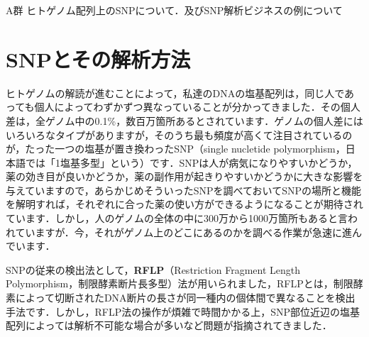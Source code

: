 \documentclass[a4paper,11pt]{jsarticle}
\numberwithin{theorem}{section}  %
\numberwithin{equation}{section} %
\begin{document}
{}
\renewcommand{\thepart}{\arabic{part}}


\begin{itembox}[l]{A群}
ヒトゲノム配列上のSNPについて．及びSNP解析ビジネスの例について
\end{itembox}

\section{SNPとその解析方法}

ヒトゲノムの解読が進むことによって，私達のDNAの塩基配列は，同じ人であっても個人によってわずかずつ異なっていることが分かってきました．その個人差は，全ゲノム中の0.1\%，数百万箇所あるとされています．ゲノムの個人差にはいろいろなタイプがありますが，そのうち最も頻度が高くて注目されているのが，たった一つの塩基が置き換わったSNP（single nucletide polymorphism，日本語では「1塩基多型」という）です\cite{genome}．SNPは人が病気になりやすいかどうか，薬の効き目が良いかどうか，薬の副作用が起きりやすいかどうかに大きな影響を与えていますので，あらかじめそういったSNPを調べておいてSNPの場所と機能を解明すれば，それぞれに合った薬の使い方ができるようになることが期待されています．しかし，人のゲノムの全体の中に300万から1000万箇所もあると言われていますが．今，それがゲノム上のどこにあるのかを調べる作業が急速に進んでいます．

SNPの従来の検出法として，{\bf RFLP}（Restriction Fragment Length Polymorphism，制限酵素断片長多型）法が用いられました，RFLPとは，制限酵素によって切断されたDNA断片の長さが同一種内の個体間で異なることを検出手法です．しかし，RFLP法の操作が煩雑で時間かかる上，SNP部位近辺の塩基配列によっては解析不可能な場合が多いなど問題が指摘されてきました．
\end{document}
